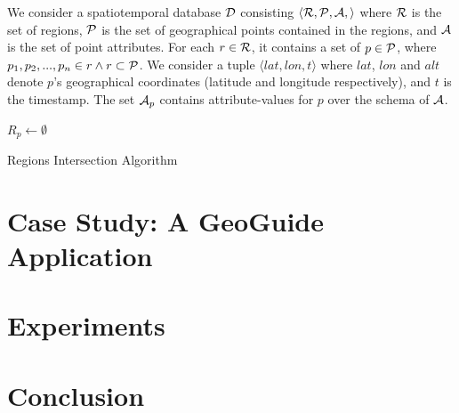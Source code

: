 \documentclass[runningheads,a4paper]{llncs}
\begin{document}
 We consider a spatiotemporal database ${\cal D}$ consisting $\langle {\cal R},  {\cal P}, {\cal A},  \rangle$ where ${\cal R}$ is the set of regions, ${\cal P}$ is the set of
geographical points contained in the regions, and ${\cal A}$ is the set of point attributes.  For each $r \in {\cal R}$,  it contains a set of $p \in {\cal P}$, where $p_1,p_2,...,p_n  \in r \land  r \subset	{\cal P}$. We consider a tuple $\langle lat, lon, t\rangle$ where $lat$, $lon$ and $alt$ denote $p$'s geographical coordinates (latitude and longitude  respectively), and $t$ is the timestamp. The set ${\cal A}_p$ contains attribute-values for $p$ over the schema of ${\cal A}$. 

\begin{algorithm}[t]
	\DontPrintSemicolon
	${ R_p} \gets \emptyset$\;\label{cd:definereturn}
	\; 
	\caption{Regions Intersection Algorithm}
	\label{algo:intersectionAlgo}
\end{algorithm}






\section{Case Study: A GeoGuide Application}

\section{Experiments}


\section{Conclusion}





\vspace{-5pt}



\end{document}

